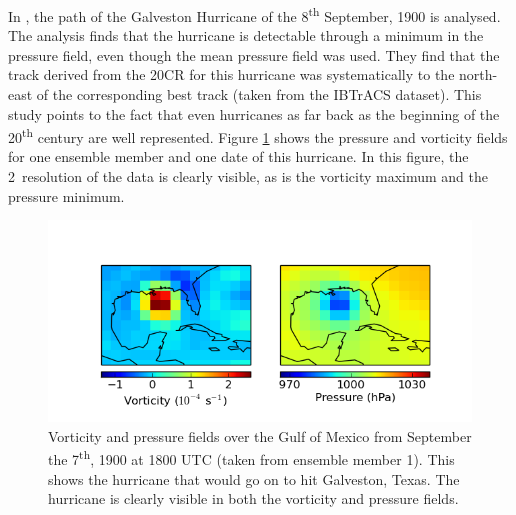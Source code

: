\documentclass[pdftex,12pt,a4paper]{report}
\newcommand{\ts}{\textsuperscript}
\begin{document}
In \textcite{neff2013analysis}, the path of the Galveston Hurricane of the 8\ts{th} September, 1900
is analysed. The analysis finds that the hurricane is detectable through a minimum in the pressure
field, even though the mean pressure field was used. They find that the track derived from the 20CR
for this hurricane was systematically to the north-east of the corresponding best track (taken from
the IBTrACS dataset). This study points to the fact that even hurricanes as far back as the
beginning of the 20\ts{th} century are well represented. Figure \ref{fig:galveston} shows the
pressure and vorticity fields for one ensemble member and one date of this hurricane. In this
figure, the 2\textdegree\ resolution of the data is clearly visible, as is the vorticity maximum and
the pressure minimum.

\begin{figure}[ht!]
    \centering
    \includegraphics[width=\textwidth]{figures/galveston_1900-9-7_18-00_em0}
    \caption{Vorticity and pressure fields over the Gulf of Mexico from September the 7\ts{th}, 1900
        at 1800 UTC (taken from ensemble member 1). This shows the hurricane that would go on to hit
        Galveston, Texas. The hurricane is clearly visible in both the vorticity and pressure fields.}
    \label{fig:galveston}
\end{figure}

\end{document}
